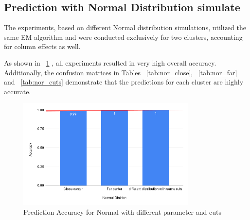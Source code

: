 \documentclass{article}
\begin{document}
\subsection{Prediction with Normal Distribution simulate}

The experiments, based on different Normal distribution simulations, 
utilized the same EM algorithm and were conducted exclusively for two clusters, 
accounting for column effects as well.

As shown in ~\ref*{fig:dist_acc} , all experiments resulted in very high overall accuracy. 
Additionally, the confusion matrices in Tables ~\ref*{tab:nor_close}, ~\ref*{tab:nor_far} and  ~\ref*{tab:nor_cuts}
demonstrate that the predictions for each cluster are highly accurate.

\begin{figure}[ht]
  \centering
  \includegraphics[width=0.8\textwidth]{images/experiments/norm_dist.png}
  \caption{Prediction Accuracy for Normal with different parameter and cuts}
  \label{fig:dist_acc}
\end{figure}
\end{document}
